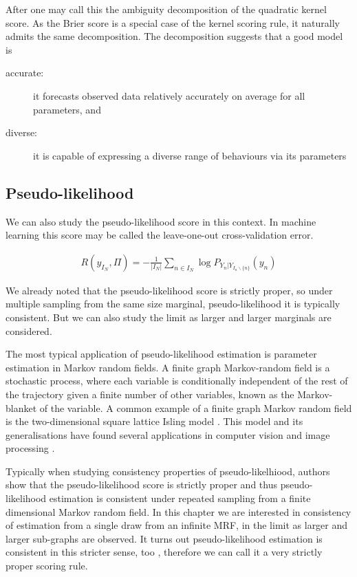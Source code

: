 After \citep{} one may call this the ambiguity decomposition of the quadratic kernel score. As the Brier score is a special case of the kernel scoring rule, it naturally admits the same decomposition. The decomposition suggests that a good model is
\begin{description}
	\item[accurate:] it forecasts observed data relatively accurately on average for all parameters, and
	\item[diverse:] it is capable of expressing a diverse range of behaviours via its parameters
\end{description}

\subsection{Pseudo-likelihood}

We can also study the pseudo-likelihood score in this context. In machine learning this score may be called the leave-one-out cross-validation error.

\begin{align}
R(y_{I_N},\Pi) = - \frac{1}{\vert I_N \vert} \sum_{n\in{I_N}}\log P_{Y_n\vert Y_{I_n\backslash\{n\}}}(y_n)
\end{align}

We already noted that the pseudo-likelihood score is strictly proper, so under multiple sampling from the same size marginal, pseudo-likelihood it is typically consistent. But we can also study the limit as larger and larger marginals are considered.

The most typical application of pseudo-likelihood estimation is parameter estimation in Markov random fields. A finite graph Markov-random field is a stochastic process, where each variable is conditionally independent of the rest of the trajectory given a finite number of other variables, known as the Markov-blanket of the variable. A common example of a finite graph Markov random field is the two-dimensional square lattice Isling model \citep{Dawid's paper}. This model and its generalisations have found several applications in computer vision and image processing \citep{}.
 
Typically when studying consistency properties of pseudo-likelhiood, authors show that the pseudo-likelihood score is strictly proper and thus pseudo-likelihood estimation is consistent under repeated sampling from a finite dimensional Markov random field. In this chapter we are interested in consistency of estimation from a single draw from an infinite MRF, in the limit as larger and larger sub-graphs are observed. It turns out pseudo-likelihood estimation is consistent in this stricter sense, too \citep{GemanGraffigne}, therefore we can call it a very strictly proper scoring rule.


